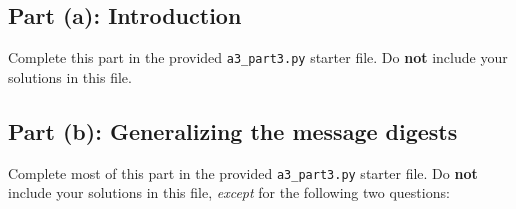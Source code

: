 \documentclass[11pt]{article}
\begin{document}
\subsection*{Part (a): Introduction}

Complete this part in the provided \texttt{a3\_part3.py} starter file.
Do \textbf{not} include your solutions in this file.

\subsection*{Part (b): Generalizing the message digests}

Complete most of this part in the provided \texttt{a3\_part3.py} starter file.
Do \textbf{not} include your solutions in this file, \emph{except} for the following two questions:
\end{document}
